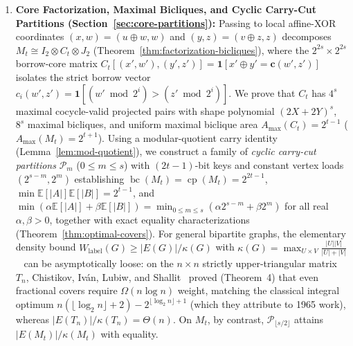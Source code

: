\documentclass[11pt,reqno]{amsart}
\theoremstyle{definition}
\theoremstyle{remark}
\DeclareMathOperator{\bc}{bc}
\DeclareMathOperator{\cp}{cp}
\newcommand{\EE}{\mathbb{E}}
\newcommand{\ind}{\mathbf{1}}
\newcommand{\bv}{\mathbf{c}}
\numberwithin{equation}{section}
\begin{document}
\begin{enumerate}[leftmargin=2em,label=\textbf{(\arabic*)}]
  \item \textbf{Core Factorization, Maximal Bicliques, and Cyclic Carry-Cut Partitions (Section~\ref{sec:core-partitions}):}
  Passing to local affine-XOR coordinates $(x, w) = (u \oplus w, w)$ and $(y, z) = (v \oplus z, z)$ decomposes $M_t \cong I_2 \otimes C_t \otimes J_2$ (Theorem~\ref{thm:factorization-bicliques}), where the $2^{2s} \times 2^{2s}$ borrow-core matrix $C_t[(x', w'), (y', z')] = \ind[x' \oplus y' = \bv(w', z')]$ isolates the strict borrow vector $c_i(w', z') = \ind[(w' \bmod 2^i) > (z' \bmod 2^i)]$. We prove that $C_t$ has $4^s$ maximal cocycle-valid projected pairs with shape polynomial $(2X + 2Y)^s$, $8^s$ maximal bicliques, and uniform maximal biclique area $A_{\max}(C_t) = 2^{t-1}$ ($A_{\max}(M_t) = 2^{t+1}$). Using a modular-quotient carry identity (Lemma~\ref{lem:mod-quotient}), we construct a family of \emph{cyclic carry-cut partitions} $\mathcal{P}_m$ ($0 \le m \le s$) with $(2t-1)$-bit keys and constant vertex loads $(2^{s-m}, 2^m)$ establishing $\bc(M_t) = \cp(M_t) = 2^{2t-1}$, $\min \EE[|A|]\EE[|B|] = 2^{t-1}$, and $\min(\alpha\EE[|A|] + \beta\EE[|B|]) = \min_{0 \le m \le s}(\alpha 2^{s-m} + \beta 2^m)$ for all real $\alpha, \beta > 0$, together with exact equality characterizations (Theorem~\ref{thm:optimal-covers}). For general bipartite graphs, the elementary density bound $W_{\mathrm{label}}(G) \ge |E(G)|/\kappa(G)$ with $\kappa(G) = \max_{U \times V} \frac{|U||V|}{|U|+|V|}$~\cite{Juk12,ILNS14} can be asymptotically loose: on the $n \times n$ strictly upper-triangular matrix $T_n$, Chistikov, Iv\'an, Lubiw, and Shallit~\cite{CILS17} proved (Theorem~4) that even fractional covers require $\Omega(n \log n)$ weight, matching the classical integral optimum $n(\lfloor \log_2 n \rfloor + 2) - 2^{\lfloor \log_2 n \rfloor + 1}$ (which they attribute to 1965 work), whereas $|E(T_n)|/\kappa(T_n) = \Theta(n)$. On $M_t$, by contrast, $\mathcal{P}_{\lfloor s/2 \rfloor}$ attains $|E(M_t)|/\kappa(M_t)$ with equality.


\end{enumerate}
\end{document}
